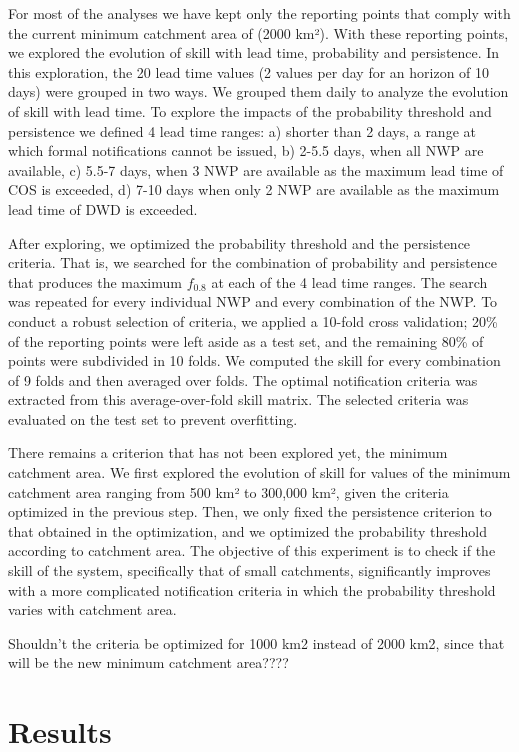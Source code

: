\documentclass[preprint,12pt]{elsarticle}
\begin{document}
For most of the analyses we have kept only the reporting points that comply with the current minimum catchment area of (2000 km²). With these reporting points, we explored the evolution of skill with lead time, probability and persistence. In this exploration, the 20 lead time values (2 values per day for an horizon of 10 days) were grouped in two ways. We grouped them daily to analyze the evolution of skill with lead time. To explore the impacts of the probability threshold and persistence we defined 4 lead time ranges: a) shorter than 2 days, a range at which formal notifications cannot be issued, b) 2-5.5 days, when all NWP are available, c) 5.5-7 days, when 3 NWP are available as the maximum lead time of COS is exceeded, d) 7-10 days when only 2 NWP are available as the maximum lead time of DWD is exceeded.

After exploring, we optimized the probability threshold and the persistence criteria. That is, we searched for the combination of probability and persistence that produces the maximum $f_{0.8}$ at each of the 4 lead time ranges. The search was repeated for every individual NWP and every combination of the NWP. To conduct a robust selection of criteria, we applied a 10-fold cross validation; 20\% of the reporting points were left aside as a test set, and the remaining 80\% of points were subdivided in 10 folds. We computed the skill for every combination of 9 folds and then averaged over folds. The optimal notification criteria was extracted from this average-over-fold skill matrix. The selected criteria was evaluated on the test set to prevent overfitting. 

There remains a criterion that has not been explored yet, the minimum catchment area. We first explored the evolution of skill for values of the minimum catchment area ranging from 500 km² to 300,000 km², given the criteria optimized in the previous step. Then, we only fixed the persistence criterion to that obtained in the optimization, and we optimized the probability threshold according to catchment area. The objective of this experiment is to check if the skill of the system, specifically that of small catchments, significantly improves with a more complicated notification criteria in which the probability threshold varies with catchment area.

Shouldn't the criteria be optimized for 1000 km2 instead of 2000 km2, since that will be the new minimum catchment area????

\section{Results}
\label{sec:results}
\end{document}
